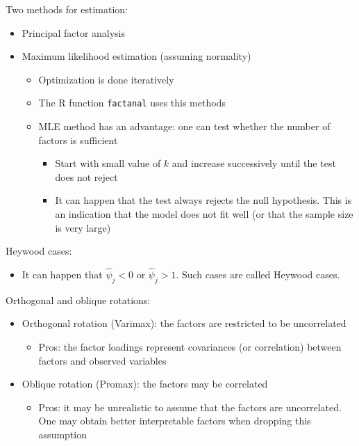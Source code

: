 \documentclass[a4paper]{article}
\begin{document}
Two methods for estimation:
\begin{itemize}
    \item Principal factor analysis
    \item Maximum likelihood estimation (assuming normality)
    \begin{itemize}
        \item Optimization is done iteratively
        \item The R function \texttt{factanal} uses this methods
        \item MLE method has an advantage: one can test whether the number of factors is sufficient
        \begin{itemize}
            \item Start with small value of $k$ and increase successively until the test does not reject
            \item It can happen that the test always rejects the null hypothesis. This is an indication that the model does not fit well (or that the sample size is very large)
        \end{itemize}
    \end{itemize}
\end{itemize}

Heywood cases:
\begin{itemize}
    \item It can happen that $\hat{\psi}_j<0$ or $\hat{\psi}_j>1$. Such cases are called Heywood cases.
\end{itemize}

Orthogonal and oblique rotations:
\begin{itemize}
    \item Orthogonal rotation (Varimax): the factors are restricted to be uncorrelated
    \begin{itemize}
        \item Pros: the factor loadings represent covariances (or correlation) between factors and observed variables
    \end{itemize}
    \item Oblique rotation (Promax): the factors may be correlated
    \begin{itemize}
        \item Pros: it may be unrealistic to assume that the factors are uncorrelated. One may obtain better interpretable factors when dropping this assumption
    \end{itemize}
\end{itemize}
\end{document}
